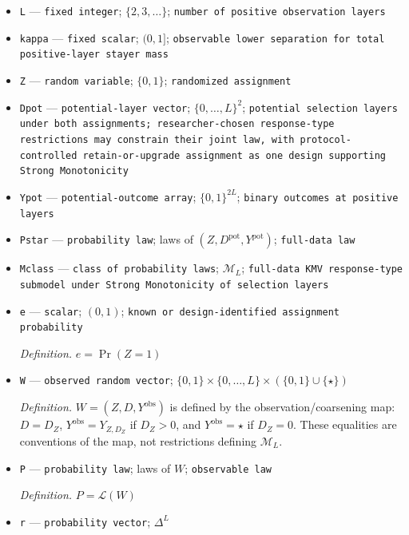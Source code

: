 \documentclass{article}
\begin{document}
\begin{itemize}
  \item \texttt{L} --- \texttt{fixed integer}; \(\{2,3,\ldots\}\); \texttt{number of positive observation layers}
  \item \texttt{kappa} --- \texttt{fixed scalar}; \((0,1]\); \texttt{observable lower separation for total positive-\allowbreak{}layer stayer mass}
  \item \texttt{Z} --- \texttt{random variable}; \(\{0,1\}\); \texttt{randomized assignment}
  \item \texttt{Dpot} --- \texttt{potential-\allowbreak{}layer vector}; \(\{0,\ldots,L\}^{2}\); \texttt{potential selection layers under both assignments;\allowbreak{} researcher-\allowbreak{}chosen response-\allowbreak{}type restrictions may constrain their joint law,\allowbreak{} with protocol-\allowbreak{}controlled retain-\allowbreak{}or-\allowbreak{}upgrade assignment as one design supporting Strong Monotonicity}
  \item \texttt{Ypot} --- \texttt{potential-\allowbreak{}outcome array}; \(\{0,1\}^{2L}\); \texttt{binary outcomes at positive layers}
  \item \texttt{Pstar} --- \texttt{probability law}; laws of \((Z,D^{\mathrm{pot}},Y^{\mathrm{pot}})\); \texttt{full-\allowbreak{}data law}
  \item \texttt{Mclass} --- \texttt{class of probability laws}; \(\mathcal M_L\); \texttt{full-\allowbreak{}data KMV response-\allowbreak{}type submodel under Strong Monotonicity of selection layers}
  \item \texttt{e} --- \texttt{scalar}; \((0,1)\); \texttt{known or design-\allowbreak{}identified assignment probability}
  \par\smallskip\noindent\emph{Definition.} \(e=\Pr(Z=1)\)
  \item \texttt{W} --- \texttt{observed random vector}; \(\{0,1\}\times\{0,\ldots,L\}\times(\{0,1\}\cup\{\star\})\)
  \par\smallskip\noindent\emph{Definition.} \(W=(Z,D,Y^{\mathrm{obs}})\) is defined by the observation/coarsening map: \(D=D_Z\), \(Y^{\mathrm{obs}}=Y_{Z,D_Z}\) if \(D_Z>0\), and \(Y^{\mathrm{obs}}=\star\) if \(D_Z=0\). These equalities are conventions of the map, not restrictions defining \(\mathcal M_L\).
  \item \texttt{P} --- \texttt{probability law}; laws of \(W\); \texttt{observable law}
  \par\smallskip\noindent\emph{Definition.} \(P=\mathcal L(W)\)
  \item \texttt{r} --- \texttt{probability vector}; \(\Delta^{L}\)

\end{itemize}
\end{document}
